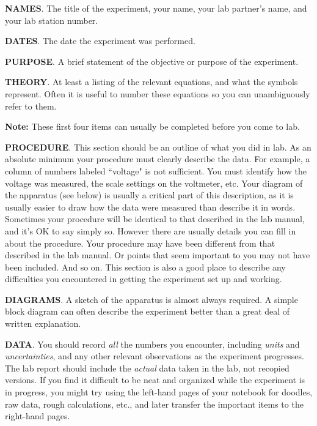 \begin{description}
\item {\bf NAMES}.  The title of the experiment, your name, your
lab partner's name, and your lab station number.

\item {\bf DATES}.  The date the experiment was performed.

\item {\bf PURPOSE}.  A brief statement of the objective or purpose of the
experiment.

\item {\bf THEORY}.  At least a listing of the relevant equations, and what the symbols
represent.  Often it is useful to number these equations so you can
unambiguously refer to them.

{\bf Note:}  These first four items can usually be completed before
you come to lab.  

\item {\bf PROCEDURE}.  This section should be an outline of
what you did in lab.  
As an absolute minimum your procedure must clearly describe
the data.  For example, a column of numbers labeled ``voltage"
is not sufficient.  You must identify how the voltage was measured,
the scale settings on the voltmeter, etc.  Your diagram of the
apparatus (see below) is usually a critical part of this
description, as it is usually easier to draw how the data
were measured than describe it in words.  Sometimes
your procedure will be identical to that
described in the lab manual, and it's OK to say simply so.
However there are usually
details you can fill in about the procedure.  Your procedure
may have been different from that described in the lab manual.
Or points that seem important to you may not have been included.
And so on.  This section is also a good place to describe any
difficulties you encountered in getting the experiment set up and
working.

\item {\bf DIAGRAMS}.  A sketch of the
apparatus is almost always required.  A simple block diagram can often describe the
experiment better than a great deal of written explanation.

\item {\bf DATA}.  You should record {\em all} the numbers
you encounter,
including {\em units} and {\em uncertainties}, and any other relevant
observations  as the experiment progresses.  The lab
report should include the {\em actual} data taken in the lab, not
recopied versions.  If you find it difficult to be neat and organized while
the experiment is in progress, you might try using the left-hand pages of
your notebook for doodles, raw data, rough calculations, etc., and later
transfer the important items to the right-hand pages.


\end{description}
